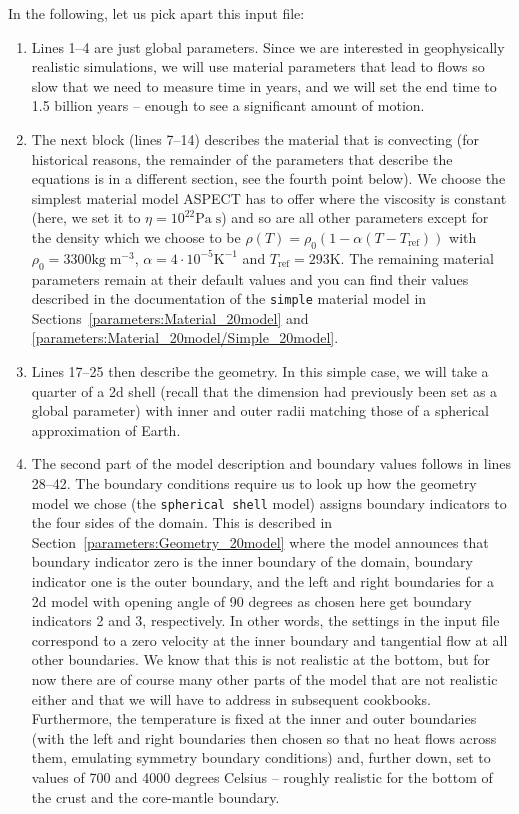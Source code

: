 \documentclass{article}
\newcommand{\aspect}{\textsc{ASPECT}}
\begin{document}
In the following, let us pick apart this input file:
\begin{enumerate}
  \item Lines 1--4 are just global parameters. Since we are interested in
  geophysically realistic simulations, we will use material parameters that
  lead to flows so slow that we need to measure time in years, and we will set
  the end time to 1.5 billion years -- enough to see a significant amount of
  motion.

  \item The next block (lines 7--14) describes the material that is convecting
  (for historical reasons, the remainder of the parameters that describe the
  equations is in a different section, see the fourth point below). We choose
  the simplest material model \aspect{} has to offer where the viscosity is
  constant (here, we set it to $\eta=10^{22} \text{Pa}\;\text{s}$) and so are
  all other parameters except for the density which we choose to be
  $\rho(T)=\rho_0(1-\alpha (T-T_{\text{ref}}))$ with $\rho_0=3300
  \text{kg}\;\text{m}^{-3}$, $\alpha=4\cdot 10^{-5} \text{K}^{-1}$ and
  $T_{\text{ref}}=293 \text{K}$. The remaining material parameters remain at their
  default values and you can find their values described in the documentation of
  the \texttt{simple} material model in
  Sections~\ref{parameters:Material_20model} and
  \ref{parameters:Material_20model/Simple_20model}.

  \item Lines 17--25 then describe the geometry. In this simple case, we will
  take a quarter of a 2d shell (recall that the dimension had previously been
  set as a global parameter) with inner and outer radii matching those of a
  spherical approximation of Earth.

  \item The second part of the model description and boundary values follows in
  lines 28--42. The boundary conditions require us to look up how the geometry model
  we chose (the \texttt{spherical shell} model) assigns boundary indicators to
  the four sides of the domain. This is described in
  Section~\ref{parameters:Geometry_20model} where the model announces that
  boundary indicator zero is the inner boundary of the domain, boundary
  indicator one is the outer boundary, and the left and right boundaries for a
  2d model with opening angle of 90 degrees as chosen here get boundary
  indicators 2 and 3, respectively. In other words, the settings in the input
  file correspond to a zero velocity at the inner boundary and tangential flow
  at all other boundaries. We know that this is not realistic at the bottom, but
  for now there are of course many other parts of the model that are not
  realistic either and that we will have to address in subsequent cookbooks.
  Furthermore, the temperature is fixed at the inner and outer boundaries (with
  the left and right boundaries then chosen so that no heat flows across them,
  emulating symmetry boundary conditions) and, further down, set to values of
  700 and 4000 degrees Celsius -- roughly realistic for the bottom of the crust
  and the core-mantle boundary.


\end{enumerate}
\end{document}
